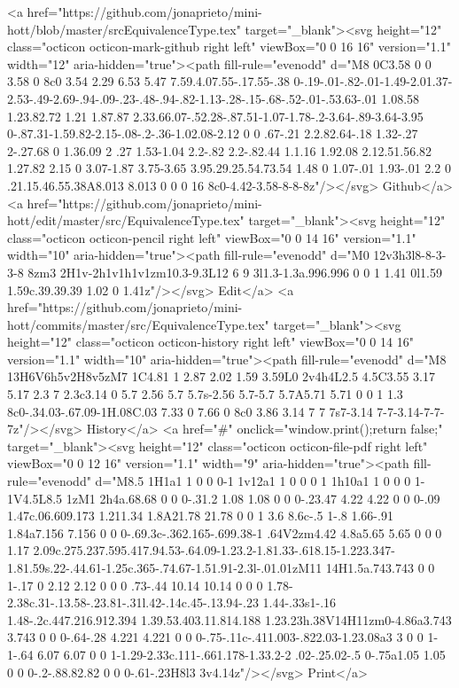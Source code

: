       <a href="https://github.com/jonaprieto/mini-hott/blob/master/srcEquivalenceType.tex" target="_blank"><svg height="12" class="octicon octicon-mark-github right left" viewBox="0 0 16 16" version="1.1" width="12" aria-hidden="true"><path fill-rule="evenodd" d="M8 0C3.58 0 0 3.58 0 8c0 3.54 2.29 6.53 5.47 7.59.4.07.55-.17.55-.38 0-.19-.01-.82-.01-1.49-2.01.37-2.53-.49-2.69-.94-.09-.23-.48-.94-.82-1.13-.28-.15-.68-.52-.01-.53.63-.01 1.08.58 1.23.82.72 1.21 1.87.87 2.33.66.07-.52.28-.87.51-1.07-1.78-.2-3.64-.89-3.64-3.95 0-.87.31-1.59.82-2.15-.08-.2-.36-1.02.08-2.12 0 0 .67-.21 2.2.82.64-.18 1.32-.27 2-.27.68 0 1.36.09 2 .27 1.53-1.04 2.2-.82 2.2-.82.44 1.1.16 1.92.08 2.12.51.56.82 1.27.82 2.15 0 3.07-1.87 3.75-3.65 3.95.29.25.54.73.54 1.48 0 1.07-.01 1.93-.01 2.2 0 .21.15.46.55.38A8.013 8.013 0 0 0 16 8c0-4.42-3.58-8-8-8z"/></svg> Github</a>
      <a href="https://github.com/jonaprieto/mini-hott/edit/master/src/EquivalenceType.tex" target="_blank"><svg height="12" class="octicon octicon-pencil right left" viewBox="0 0 14 16" version="1.1" width="10" aria-hidden="true"><path fill-rule="evenodd" d="M0 12v3h3l8-8-3-3-8 8zm3 2H1v-2h1v1h1v1zm10.3-9.3L12 6 9 3l1.3-1.3a.996.996 0 0 1 1.41 0l1.59 1.59c.39.39.39 1.02 0 1.41z"/></svg> Edit</a>
      <a href="https://github.com/jonaprieto/mini-hott/commits/master/src/EquivalenceType.tex" target="_blank"><svg height="12" class="octicon octicon-history right left" viewBox="0 0 14 16" version="1.1" width="10" aria-hidden="true"><path fill-rule="evenodd" d="M8 13H6V6h5v2H8v5zM7 1C4.81 1 2.87 2.02 1.59 3.59L0 2v4h4L2.5 4.5C3.55 3.17 5.17 2.3 7 2.3c3.14 0 5.7 2.56 5.7 5.7s-2.56 5.7-5.7 5.7A5.71 5.71 0 0 1 1.3 8c0-.34.03-.67.09-1H.08C.03 7.33 0 7.66 0 8c0 3.86 3.14 7 7 7s7-3.14 7-7-3.14-7-7-7z"/></svg> History</a>
      <a  href="#" onclick="window.print();return false;" target="_blank"><svg height="12" class="octicon octicon-file-pdf right left" viewBox="0 0 12 16" version="1.1" width="9" aria-hidden="true"><path fill-rule="evenodd" d="M8.5 1H1a1 1 0 0 0-1 1v12a1 1 0 0 0 1 1h10a1 1 0 0 0 1-1V4.5L8.5 1zM1 2h4a.68.68 0 0 0-.31.2 1.08 1.08 0 0 0-.23.47 4.22 4.22 0 0 0-.09 1.47c.06.609.173 1.211.34 1.8A21.78 21.78 0 0 1 3.6 8.6c-.5 1-.8 1.66-.91 1.84a7.156 7.156 0 0 0-.69.3c-.362.165-.699.38-1 .64V2zm4.42 4.8a5.65 5.65 0 0 0 1.17 2.09c.275.237.595.417.94.53-.64.09-1.23.2-1.81.33-.618.15-1.223.347-1.81.59s.22-.44.61-1.25c.365-.74.67-1.51.91-2.3l-.01.01zM11 14H1.5a.743.743 0 0 1-.17 0 2.12 2.12 0 0 0 .73-.44 10.14 10.14 0 0 0 1.78-2.38c.31-.13.58-.23.81-.31l.42-.14c.45-.13.94-.23 1.44-.33s1-.16 1.48-.2c.447.216.912.394 1.39.53.403.11.814.188 1.23.23h.38V14H11zm0-4.86a3.743 3.743 0 0 0-.64-.28 4.221 4.221 0 0 0-.75-.11c-.411.003-.822.03-1.23.08a3 3 0 0 1-1-.64 6.07 6.07 0 0 1-1.29-2.33c.111-.661.178-1.33.2-2 .02-.25.02-.5 0-.75a1.05 1.05 0 0 0-.2-.88.82.82 0 0 0-.61-.23H8l3 3v4.14z"/></svg> Print</a>
